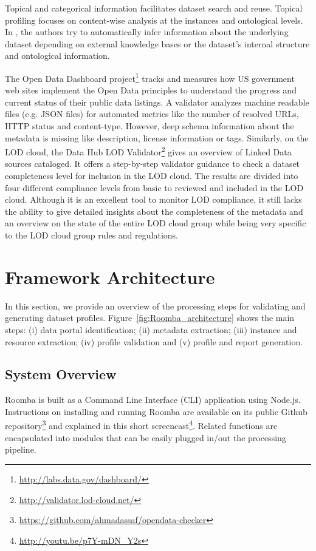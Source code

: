 \documentclass{sig-alternate}
\begin{document}
Topical and categorical information facilitates dataset search and reuse. Topical profiling focuses on content-wise analysis at the instances and ontological levels. In \cite{6690016,Bohm:2012:LTG:2396761.2398718,scalableApproach}, the authors try to automatically infer information about the underlying dataset depending on external knowledge bases or the dataset's internal structure and ontological information.

The Open Data Dashboard project\footnote{\url{http://labs.data.gov/dashboard/}} tracks and measures how US government web sites implement the Open Data principles to understand the progress and current status of their public data listings. A validator analyzes machine readable files (e.g. JSON files) for automated metrics like the number of resolved URLs, HTTP status and content-type. However, deep schema information about the metadata is missing like description, license information or tags. Similarly, on the LOD cloud, the Data Hub LOD Validator\footnote{\url{http://validator.lod-cloud.net/}} gives an overview of Linked Data sources cataloged. It offers a step-by-step validator guidance to check a dataset completeness level for inclusion in the LOD cloud. The results are divided into four different compliance levels from basic to reviewed and included in the LOD cloud. Although it is an excellent tool to monitor LOD compliance, it still lacks the ability to give detailed insights about the completeness of the metadata and an overview on the state of the entire LOD cloud group while being very specific to the LOD cloud group rules and regulations.


\section{Framework Architecture}
\label{sec:framework}
In this section, we provide an overview of the processing steps for validating and generating dataset profiles. Figure~\ref{fig:Roomba_architecture} shows the main steps: (i) data portal identification; (ii) metadata extraction; (iii) instance and resource extraction; (iv) profile validation and (v) profile and report generation.

\subsection{System Overview}
Roomba is built as a Command Line Interface (CLI) application using Node.js. Instructions on installing and running Roomba are available on its public Github repository\footnote{\url{https://github.com/ahmadassaf/opendata-checker}} and explained in this short screencast\footnote{\url{http://youtu.be/p7Y-mDN_Y2s}}. Related functions are encapsulated into modules that can be easily plugged in/out the processing pipeline.
\end{document}
